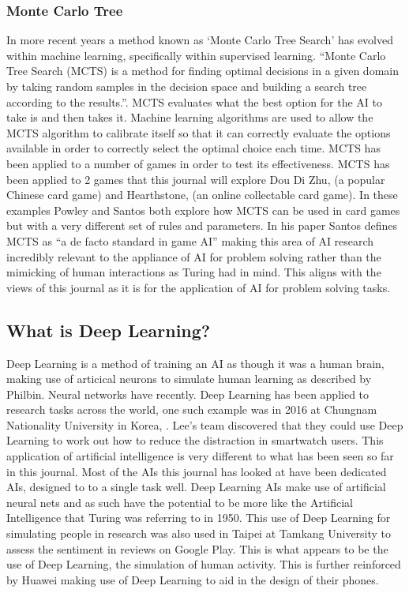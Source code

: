 \documentclass[10pt,a4paper]{scrartcl}
\begin{document}
\begin{multicols}{2}
			\subsubsection{Monte Carlo Tree}
				In more recent years a method known as `Monte Carlo Tree Search' has evolved within machine learning, specifically within supervised learning. ``Monte Carlo Tree Search (MCTS) is a method for finding optimal decisions in a given domain by taking random samples in the decision space and building a search tree according to the results.''\cite{MonteCarloSurvey}. MCTS evaluates what the best option for the AI to take is and then takes it. Machine learning algorithms are used to allow the MCTS algorithm to calibrate itself so that it can correctly evaluate the options available in order to correctly select the optimal choice each time. MCTS has been applied to a number of games in order to test its effectiveness. MCTS has been applied to 2 games that this journal will explore Dou Di Zhu, (a popular Chinese card game)\cite{DouDiZhuMCTS} and Hearthstone, (an online collectable card game)\cite{HearthstoneMCTS}. In these examples Powley and Santos both explore how MCTS can be used in card games but with a very different set of rules and parameters. In his paper Santos defines MCTS as ``a de facto standard in game AI''\cite{HearthstoneMCTS} making this area of AI research incredibly relevant to the appliance of AI for problem solving rather than the mimicking of human interactions as Turing had in mind. This aligns with the views of this journal as it is for the application of AI for problem solving tasks.


		\subsection{What is Deep Learning?}
		Deep Learning is a method of training an AI as though it was a human brain, making use of articical neurons to simulate human learning as described by Philbin\cite{CrashCourse}. Neural networks have recently. Deep Learning has been applied to research tasks across the world, one such example was in 2016 at Chungnam Nationality University in Korea, \cite{DeepLearningSmartwatches}. Lee's team discovered that they could use Deep Learning to work out how to reduce the distraction in smartwatch users. This application of artificial intelligence is very different to what has been seen so far in this journal. Most of the AIs this journal has looked at have been dedicated AIs, designed to to a single task well. Deep Learning AIs make use of artificial neural nets\cite{CrashCourse} and as such have the potential to be more like the Artificial Intelligence that Turing was referring to in 1950\cite{turingComputing}. This use of Deep Learning for simulating people in research was also used in Taipei at Tamkang University to assess the sentiment in reviews on Google Play\cite{GooglePlayTaipei}. This is what appears to be the use of Deep Learning, the simulation of human activity. This is further reinforced by Huawei making use of Deep Learning to aid in the design of their phones\cite{huawei}.



\end{multicols}
\end{document}
